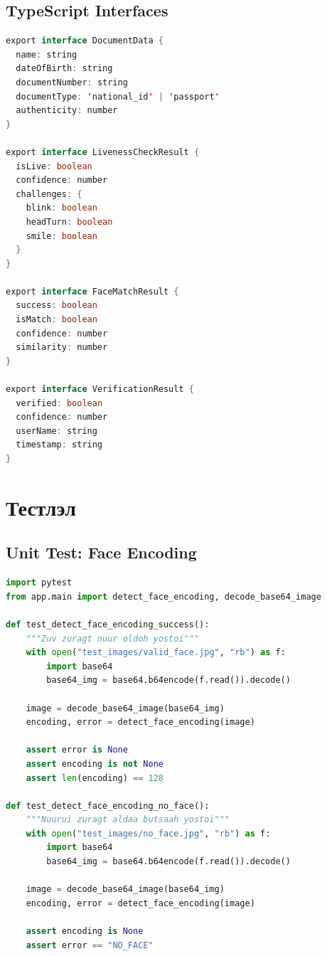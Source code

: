 \documentclass[12pt,a4paper]{article}
\begin{document}
\subsection{TypeScript Interfaces}

\begin{lstlisting}[language=Java, caption={types/verification.ts}]
export interface DocumentData {
  name: string
  dateOfBirth: string
  documentNumber: string
  documentType: 'national_id' | 'passport'
  authenticity: number
}

export interface LivenessCheckResult {
  isLive: boolean
  confidence: number
  challenges: {
    blink: boolean
    headTurn: boolean
    smile: boolean
  }
}

export interface FaceMatchResult {
  success: boolean
  isMatch: boolean
  confidence: number
  similarity: number
}

export interface VerificationResult {
  verified: boolean
  confidence: number
  userName: string
  timestamp: string
}
\end{lstlisting}

\section{Тестлэл}

\subsection{Unit Test: Face Encoding}

\begin{lstlisting}[language=Python, caption={Unit Test for Face Detection}]
import pytest
from app.main import detect_face_encoding, decode_base64_image

def test_detect_face_encoding_success():
    """Zuv zuragt nuur oldoh yostoi"""
    with open("test_images/valid_face.jpg", "rb") as f:
        import base64
        base64_img = base64.b64encode(f.read()).decode()
    
    image = decode_base64_image(base64_img)
    encoding, error = detect_face_encoding(image)
    
    assert error is None
    assert encoding is not None
    assert len(encoding) == 128

def test_detect_face_encoding_no_face():
    """Nuurui zuragt aldaa butsaah yostoi"""
    with open("test_images/no_face.jpg", "rb") as f:
        import base64
        base64_img = base64.b64encode(f.read()).decode()
    
    image = decode_base64_image(base64_img)
    encoding, error = detect_face_encoding(image)
    
    assert encoding is None
    assert error == "NO_FACE"
\end{lstlisting}
\end{document}

